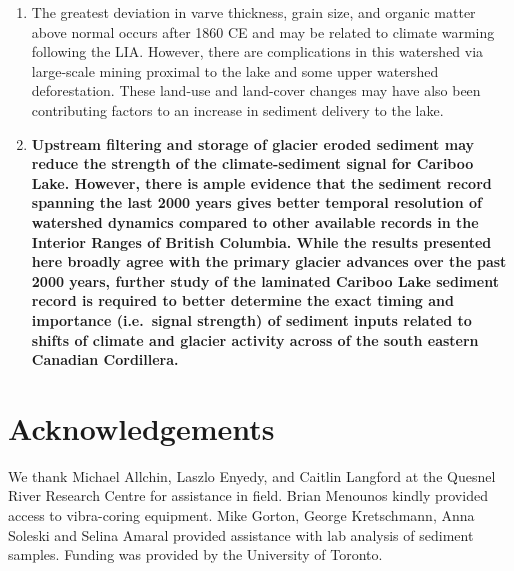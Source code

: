 \documentclass[Royal,times,doublespace,sageh]{sagej}
\begin{document}
\begin{enumerate}
{  (\textasciitilde1600 to 1900 CE) are best correlated with grain size
  in Cariboo Lake. The trends in varve thickness were not as strong but
  still help confirm trends observed in grain size. Organic matter
  content is the least correlated with the other sediment metrics and
  may be more sensitive to vegetation changes in the basin. We conclude
  that sediment accumulation in Cariboo Lake was more sensitive to
  glacier activity and sediment production during the LIA compared to
  earlier advances.}
\item
  The greatest deviation in varve thickness, grain size, and organic
  matter above normal occurs after 1860 CE and may be related to climate
  warming following the LIA. However, there are complications in this
  watershed via large-scale mining proximal to the lake and some upper
  watershed deforestation. These land-use and land-cover changes may
  have also been contributing factors to an increase in sediment
  delivery to the lake.
\item
  \textbf{Upstream filtering and storage of glacier eroded sediment may
  reduce the strength of the climate-sediment signal for Cariboo Lake.
  However, there is ample evidence that the sediment record spanning the
  last 2000 years gives better temporal resolution of watershed dynamics
  compared to other available records in the Interior Ranges of British
  Columbia. While the results presented here broadly agree with the
  primary glacier advances over the past 2000 years, further study of
  the laminated Cariboo Lake sediment record is required to better
  determine the exact timing and importance (i.e.~signal strength) of
  sediment inputs related to shifts of climate and glacier activity
  across of the south eastern Canadian Cordillera.}
\end{enumerate}

\pagebreak

\hypertarget{acknowledgements}{%
\section{Acknowledgements}\label{acknowledgements}}

We thank Michael Allchin, Laszlo Enyedy, and Caitlin Langford at the
Quesnel River Research Centre for assistance in field. Brian Menounos
kindly provided access to vibra-coring equipment. Mike Gorton, George
Kretschmann, Anna Soleski and Selina Amaral provided assistance with lab
analysis of sediment samples. Funding was provided by the University of
Toronto.
\end{document}
